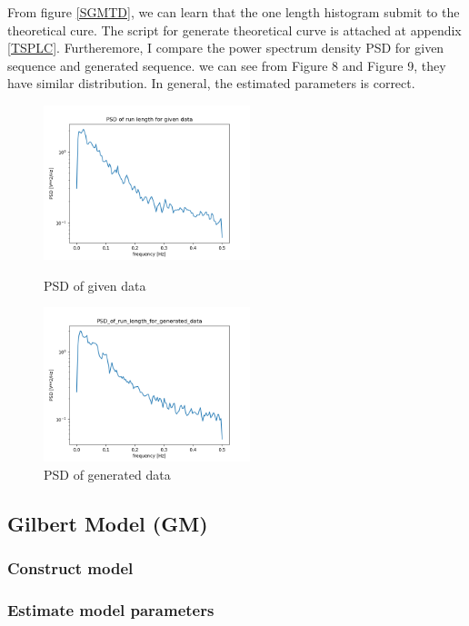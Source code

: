 \documentclass[11pt]{article}
\begin{document}
From figure \ref{SGMTD}, we can learn that the one length histogram submit to the theoretical cure.
The script for generate theoretical curve is attached at appendix \ref{TSPLC}.
Furtheremore, I compare the power spectrum density PSD for given sequence and generated sequence.
we can see from Figure 8 and Figure 9, they have similar distribution.
In general, the estimated parameters is correct.
\begin{figure}[htbp]
    \centering
    \begin{minipage}[t]{0.48\textwidth}
    \centering
    \includegraphics[width=6cm]{PSD_of_run_length_for_given_data.png}
    \caption{PSD of given data}
    \end{minipage}
    \begin{minipage}[t]{0.48\textwidth}
    \centering
    \includegraphics[width=6cm]{PSD_of_run_length_for_generated_data.png}
    \caption{PSD of generated data}
    \end{minipage}
\end{figure}
\subsection{Gilbert Model (GM)}
\subsubsection{Construct model}

\subsubsection{Estimate model parameters}
\end{document}
